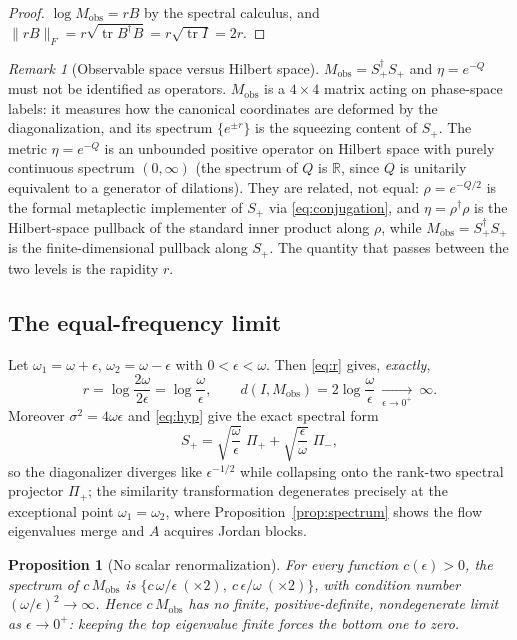 \documentclass[11pt]{article}
\newtheorem{proposition}[theorem]{Proposition}
\theoremstyle{definition}
\theoremstyle{remark}
\newtheorem{remark}[theorem]{Remark}
\newcommand{\R}{\mathbb{R}}
\newcommand{\w}{\omega}
\newcommand{\tr}{\operatorname{tr}}
\newcommand{\Mobs}{M_{\mathrm{obs}}}
\newcommand{\dg}{\dagger}
\begin{document}
\begin{proof}
$\log\Mobs=rB$ by the spectral calculus, and
$\|rB\|_F=r\sqrt{\tr B^{\dg}B}=r\sqrt{\tr I}=2r$.
\end{proof}

\begin{remark}[Observable space versus Hilbert space]\label{rem:twospaces}
$\Mobs=S_+^{\dg}S_+$ and $\eta=e^{-Q}$ must not be identified as operators.
$\Mobs$ is a $4\times4$ matrix acting on phase-space labels: it measures how
the canonical coordinates are deformed by the diagonalization, and its
spectrum $\{e^{\pm r}\}$ is the squeezing content of $S_+$.  The metric
$\eta=e^{-Q}$ is an unbounded positive operator on Hilbert space with purely
continuous spectrum $(0,\infty)$ (the spectrum of $Q$ is $\R$, since $Q$ is
unitarily equivalent to a generator of dilations).  They are related, not
equal: $\rho=e^{-Q/2}$ is the formal metaplectic implementer of $S_+$ via
\eqref{eq:conjugation}, and $\eta=\rho^{\dg}\rho$ is the Hilbert-space
pullback of the standard inner product along $\rho$, while
$\Mobs=S_+^{\dg}S_+$ is the finite-dimensional pullback along $S_+$.  The
quantity that passes between the two levels is the rapidity $r$.
\end{remark}

\subsection{The equal-frequency limit}

Let $\w_1=\w+\epsilon$, $\w_2=\w-\epsilon$ with $0<\epsilon<\w$.  Then
\eqref{eq:r} gives, \emph{exactly},
\begin{equation}
r=\log\frac{2\w}{2\epsilon}=\log\frac{\w}{\epsilon},
\qquad
d(I,\Mobs)=2\log\frac{\w}{\epsilon}\ \xrightarrow[\epsilon\to0^+]{}\ \infty .
\end{equation}
Moreover $\sigma^2=4\w\epsilon$ and \eqref{eq:hyp} give the exact spectral
form
\begin{equation}
S_+=\sqrt{\frac{\w}{\epsilon}}\;\Pi_+
+\sqrt{\frac{\epsilon}{\w}}\;\Pi_- ,
\end{equation}
so the diagonalizer diverges like $\epsilon^{-1/2}$ while collapsing onto the
rank-two spectral projector $\Pi_+$; the similarity transformation
degenerates precisely at the exceptional point $\w_1=\w_2$, where
Proposition~\ref{prop:spectrum} shows the flow eigenvalues merge and $A$
acquires Jordan blocks.

\begin{proposition}[No scalar renormalization]\label{prop:noscalar}
For every function $c(\epsilon)>0$, the spectrum of $c\,\Mobs$ is
$\{c\,\w/\epsilon\ (\times2),\ c\,\epsilon/\w\ (\times2)\}$, with condition
number $(\w/\epsilon)^2\to\infty$.  Hence $c\,\Mobs$ has no finite,
positive-definite, nondegenerate limit as $\epsilon\to0^+$: keeping the top
eigenvalue finite forces the bottom one to zero.
\end{proposition}
\end{document}
